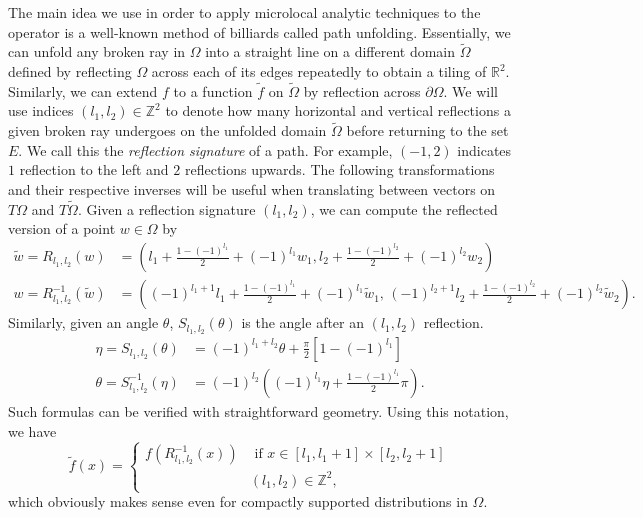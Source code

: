 \documentclass[10pt]{amsart}
\theoremstyle{definition}
\theoremstyle{definition}
\theoremstyle{definition}
\newcommand{ \rn }[1]{\mathbb{R}^{#1}}
\begin{document}
The main idea we use in order to apply microlocal analytic techniques to the operator is a well-known method of billiards called path unfolding. Essentially, we can unfold any broken ray in $\Omega$ into a straight line on a different domain $\widetilde{\Omega}$ defined by reflecting $\Omega$ across each of its edges repeatedly to obtain a tiling of $\rn{2}$. Similarly, we can extend $f$ to a function $\widetilde{f}$ on $\widetilde{\Omega}$ by reflection across $\partial \Omega$. We will use indices $(l_{1},l_{2}) \in \mathbb{Z}^{2}$ to denote how many horizontal and vertical reflections a given broken ray undergoes on the unfolded domain $\widetilde{\Omega}$ before returning to the set $E$. We call this the \textit{reflection signature} of a path. For example, $(-1,2)$ indicates $1$ reflection to the left and $2$ reflections upwards. The following transformations and their respective inverses will be useful when translating between vectors on
$T\Omega$ and $T \widetilde{\Omega}$. Given a reflection signature $(l_{1},l_{2})$, we can compute the reflected version of a point $w \in \Omega$ by
\begin{align}
\widetilde{w} = R_{l_{1},l_{2}}(w) & = \left( l_{1} + \frac{1 - (-1)^{l_{1}}}{2} + (-1)^{l_{1}}w_{1}, l_{2} + \frac{1 - (-1)^{l_{2}}}{2} + (-1)^{l_{2}}w_{2} \right)\\
w = R_{l_{1},l_{2}}^{-1}(\widetilde{w}) & = \left( (-1)^{l_{1}+1}l_{1} + \frac{1-(-1)^{l_{1}}}{2} + (-1)^{l_{1}}\widetilde{w}_{1}, \, (-1)^{l_{2}+1}l_{2} + \frac{1-(-1)^{l_{2}}}{2} + (-1)^{l_{2}}\widetilde{w}_{2} \right).
\end{align}
Similarly, given an angle $\theta$, $S_{l_{1},l_{2}}(\theta)$ is the angle after an $(l_{1},l_{2})$ reflection. 
\begin{align}
\eta = S_{l_{1},l_{2}}(\theta) &= (-1)^{l_{1}+l_{2}}\theta + \frac{\pi}{2}\left[ 1 - (-1)^{l_{1}} \right]\\
\theta = S_{l_{1},l_{2}}^{-1}(\eta) & = (-1)^{l_{2}}\left( (-1)^{l_{1}} \eta + \frac{1-(-1)^{l_{1}}}{2}\pi \right).
\end{align}
Such formulas can be verified with straightforward geometry. Using this notation, we have
\begin{equation}
\widetilde{f}(x) = \left\{ \begin{array}{ll}
f(R_{l_{1},l_{2}}^{-1}(x)) & \textrm{ if }x \in [l_{1},l_{1}+1] \times [l_{2},l_{2}+1]\\
& (l_{1},l_{2}) \in \mathbb{Z}^{2},
\end{array}\right.
\end{equation}
which obviously makes sense even for compactly supported distributions in $\Omega$.
\end{document}
